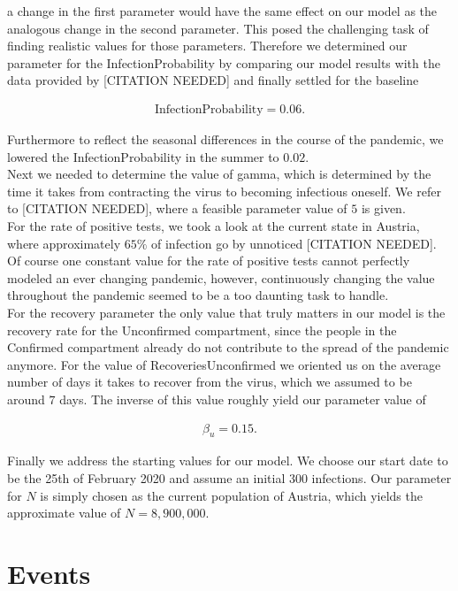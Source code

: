 \documentclass
[
    a4paper,
    11pt,
    bibliography = totoc,
    listof = totoc,
    headinclude = true,
]
{scrreprt}
\begin{document}
a change in the first parameter would have the same effect on our model
as the analogous change in the second parameter.
This posed the challenging task of finding realistic values for those parameters.
Therefore we determined our parameter for the InfectionProbability by comparing
our model results with the data provided by [CITATION NEEDED] and finally
settled for the baseline

\begin{align*}
  \text{InfectionProbability} = 0.06.
\end{align*}

Furthermore to reflect the seasonal differences in the course of the pandemic,
we lowered the InfectionProbability in the summer to $0.02$. \\
Next we needed to determine the value of gamma, which is determined by the time
it takes from contracting the virus to becoming infectious oneself.
We refer to [CITATION NEEDED], where a feasible parameter value of $5$ is given. \\
For the rate of positive tests, we took a look at the current state in Austria,
where approximately $65\%$ of infection go by unnoticed [CITATION NEEDED].
Of course one constant value for the rate of positive tests cannot perfectly
modeled an ever changing pandemic, however, continuously changing the value
throughout the pandemic seemed to be a too daunting task to handle. \\
For the recovery parameter the only value that truly matters in our model
is the recovery rate for the Unconfirmed compartment, since the people in the
Confirmed compartment already do not contribute to the spread of the pandemic anymore.
For the value of RecoveriesUnconfirmed we oriented us on the average number of days
it takes to recover from the virus, which we assumed to be around $7$ days.
The inverse of this value roughly yield our parameter value of

\begin{align*}
  \beta_u = 0.15.
\end{align*}

Finally we address the starting values for our model. We choose our start date
to be the 25th of February 2020 and assume an initial 300 infections.
Our parameter for $N$ is simply chosen as the current population of Austria,
which yields the approximate value of $N = 8,900,000$.

\section{Events}
\end{document}
